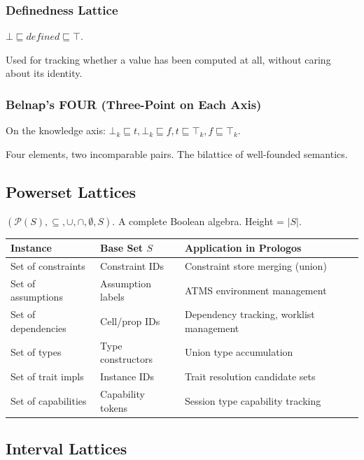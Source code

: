 \documentclass[11pt]{article}
\begin{document}
\subsubsection{Definedness Lattice}
\label{sec:orgdf34f32}

\(\bot \sqsubseteq \mathit{defined} \sqsubseteq \top\).

Used for tracking whether a value has been computed at all, without caring about
its identity.
\subsubsection{Belnap's FOUR (Three-Point on Each Axis)}
\label{sec:orga17b6ce}

On the knowledge axis: \(\bot_k \sqsubseteq t, \bot_k \sqsubseteq f, t
\sqsubseteq \top_k, f \sqsubseteq \top_k\).

Four elements, two incomparable pairs. The bilattice of well-founded semantics.
\subsection{Powerset Lattices}
\label{sec:org710c590}

\((\mathcal{P}(S), \subseteq, \cup, \cap, \emptyset, S)\). A complete Boolean
algebra. Height = \(|S|\).

\begin{center}
\begin{tabular}{lll}
Instance & Base Set \(S\) & Application in Prologos\\
\hline
Set of constraints & Constraint IDs & Constraint store merging (union)\\
Set of assumptions & Assumption labels & ATMS environment management\\
Set of dependencies & Cell/prop IDs & Dependency tracking, worklist management\\
Set of types & Type constructors & Union type accumulation\\
Set of trait impls & Instance IDs & Trait resolution candidate sets\\
Set of capabilities & Capability tokens & Session type capability tracking\\
\end{tabular}
\end{center}
\subsection{Interval Lattices}
\label{sec:org48be46a}
\end{document}
